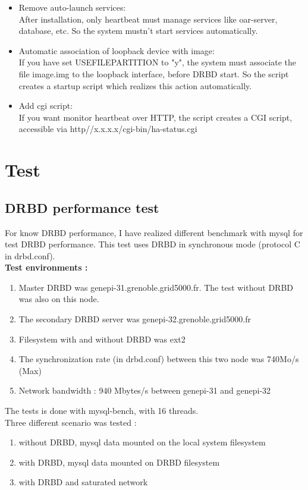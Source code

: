 \documentclass[a4paper,10pt]{report}
\begin{document}
\begin{itemize}
 \item Remove auto-launch services:\\
After installation, only heartbeat must manage services like oar-server, database, etc. So the system mustn't start services automatically.
 \item Automatic association of loopback device with image:\\
If you have set USEFILEPARTITION to "y", the system must associate the file image.img to the loopback interface, before DRBD start. So the script creates a startup script which realizes this action automatically.
 \item Add cgi script:\\
If you want monitor heartbeat over HTTP, the script creates a CGI script, accessible via http//x.x.x.x/cgi-bin/ha-status.cgi
\end{itemize}





\chapter{Test}

\section{DRBD performance test}

For know DRBD performance, I have realized different benchmark with mysql for test DRBD performance. This test uses DRBD in synchronous mode (protocol C in drbd.conf).\\
\textbf{Test environments :}
\begin{enumerate}
 \item Master DRBD was genepi-31.grenoble.grid5000.fr. The test without DRBD was also on this node.
 \item The secondary DRBD server was genepi-32.grenoble.grid5000.fr 
 \item Filesystem with and without DRBD was ext2
 \item The synchronization rate (in drbd.conf) between this two node was 740Mo/s (Max)
 \item Network bandwidth : 940 Mbytes/s between genepi-31 and genepi-32
\end{enumerate}
The tests is done with mysql-bench, with 16 threads.\\

Three different scenario was tested :
\begin{enumerate}
 \item without DRBD, mysql data mounted on the local system filesystem 
 \item with DRBD, mysql data mounted on DRBD filesystem 
 \item with DRBD and saturated network 
\end{enumerate}
\end{document}
